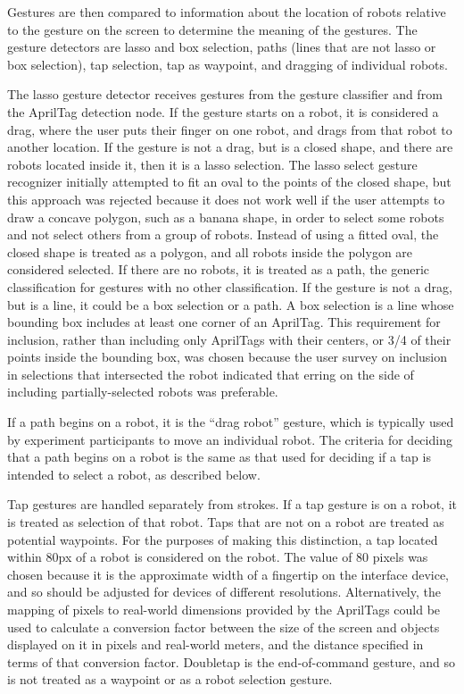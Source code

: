 Gestures are then compared to information about the location of robots relative to the gesture on the screen to determine the meaning of the gestures. 
The gesture detectors are lasso and box selection, paths (lines that are not lasso or box selection), tap selection, tap as waypoint, and dragging of individual robots. 

The lasso gesture detector receives gestures from the gesture classifier and from the AprilTag detection node. 
If the gesture starts on a robot, it is considered a drag, where the user puts their finger on one robot, and drags from that robot to another location. 
If the gesture is not a drag, but is a closed shape, and there are robots located inside it, then it is a lasso selection. 
The lasso select gesture recognizer initially attempted to fit an oval to the points of the closed shape, but this approach was rejected because it does not work well if the user attempts to draw a concave polygon, such as a banana shape, in order to select some robots and not select others from a group of robots. 
Instead of using a fitted oval, the closed shape is treated as a polygon, and all robots inside the polygon are considered selected. 
If there are no robots, it is treated as a path, the generic classification for gestures with no other classification. 
If the gesture is not a drag, but is a line, it could be a box selection or a path. 
A box selection is a line whose bounding box includes at least one corner of an AprilTag. 
This requirement for inclusion, rather than including only AprilTags with their centers, or 3/4 of their points inside the bounding box, was chosen because the user survey on inclusion in selections that intersected the robot indicated that erring on the side of including partially-selected robots was preferable. 

If a path begins on a robot, it is the ``drag robot'' gesture, which is typically used by experiment participants to move an individual robot. 
The criteria for deciding that a path begins on a robot is the same as that used for deciding if a tap is intended to select a robot, as described below. 

Tap gestures are handled separately from strokes. 
If a tap gesture is on a robot, it is treated as selection of that robot. 
Taps that are not on a robot are treated as potential waypoints. 
For the purposes of making this distinction, a tap located within 80px of a robot is considered on the robot. 
The value of 80 pixels was chosen because it is the approximate width of a fingertip on the interface device, and so should be adjusted for devices of different resolutions. 
Alternatively, the mapping of pixels to real-world dimensions provided by the AprilTags could be used to calculate a conversion factor between the size of the screen and objects displayed on it in pixels and real-world meters, and the distance specified in terms of that conversion factor. 
Doubletap is the end-of-command gesture, and so is not treated as a waypoint or as a robot selection gesture. 

